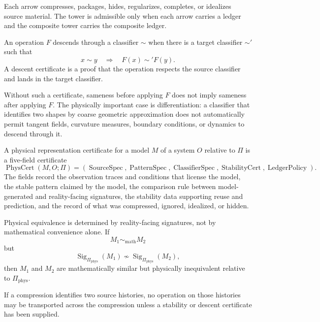 Each arrow compresses, packages, hides, regularizes, completes, or idealizes source material. The tower is admissible only when each arrow carries a ledger and the composite tower carries the composite ledger.

\begin{definition}
\label{def:reality-constrained-operational-descent}
An operation $F$ descends through a classifier $\sim$ when there is a target classifier $\sim'$ such that
$$
x\sim y
\quad\Longrightarrow\quad
F(x)\sim'F(y).
$$
A descent certificate is a proof that the operation respects the source classifier and lands in the target classifier.
\end{definition}

Without such a certificate, sameness before applying $F$ does not imply sameness after applying $F$. The physically important case is differentiation: a classifier that identifies two shapes by coarse geometric approximation does not automatically permit tangent fields, curvature measures, boundary conditions, or dynamics to descend through it.

\begin{definition}
\label{def:physical-representation-certificate}
A physical representation certificate for a model $M$ of a system $O$ relative to $\Pi$ is a five-field certificate
$$
\operatorname{PhysCert}(M,O;\Pi)
=
(\operatorname{SourceSpec},
\operatorname{PatternSpec},
\operatorname{ClassifierSpec},
\operatorname{StabilityCert},
\operatorname{LedgerPolicy}).
$$
The fields record the observation traces and conditions that license the model, the stable pattern claimed by the model, the comparison rule between model-generated and reality-facing signatures, the stability data supporting reuse and prediction, and the record of what was compressed, ignored, idealized, or hidden.
\end{definition}

\begin{principle}
\label{prin:reality-signature-priority}
Physical equivalence is determined by reality-facing signatures, not by mathematical convenience alone. If
$$
M_1\sim_{\mathrm{math}}M_2
$$
but
$$
\operatorname{Sig}_{\Pi_{\mathrm{phys}}}(M_1)
\not\sim
\operatorname{Sig}_{\Pi_{\mathrm{phys}}}(M_2),
$$
then $M_1$ and $M_2$ are mathematically similar but physically inequivalent relative to $\Pi_{\mathrm{phys}}$.
\end{principle}

\begin{principle}
\label{prin:no-free-transfer-of-structure}
If a compression identifies two source histories, no operation on those histories may be transported across the compression unless a stability or descent certificate has been supplied.
\end{principle}

